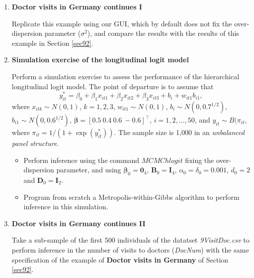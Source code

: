 \begin{enumerate}
\item \textbf{Doctor visits in Germany continues I}

Replicate this example using our GUI, which by default does not fix the over-dispersion parameter ($\sigma^2$), and compare the results with the results of this example in Section \ref{sec92}.

\item \textbf{Simulation exercise of the longitudinal logit model}

Perform a simulation exercise to assess the performance of the hierarchical longitudinal logit model. The point of departure is to assume that \[y_{it}^*=\beta_0+\beta_1x_{it1}+\beta_2x_{it2}+\beta_3x_{it3}+b_i+w_{it1}b_{i1},\]
where $x_{itk}\sim N(0,1)$, $k=1,2,3$, $w_{it1}\sim N(0,1)$, $b_i\sim N(0, 0.7^{1/2})$, $b_{i1}\sim N(0, 0.6^{1/2})$, $\bm{\beta}=[0.5 \ 0.4 \ 0.6 \ -0.6]^{\top}$, $i=1,2,\dots,50$, and $y_{it}\sim B(\pi_{it}$, where $\pi_{it}=1/(1+\exp(y_{it}^*))$. The sample size is 1,000 in an \textit{unbalanced panel structure}.

\begin{itemize}
	\item Perform inference using the command $MCMChlogit$ fixing the over-dispersion parameter, and using $\bm{\beta}_0=\bm{0}_4$, $\bm{B}_0=\bm{I}_4$, $\alpha_0=\delta_0=0.001$, $d_0=2$ and $\bm{D}_0=\bm{I}_2$.
	\item Program from scratch a Metropolis-within-Gibbs algorithm to perform inference in this simulation.  
\end{itemize} 

\item \textbf{Doctor visits in Germany continues II} 

Take a sub-sample of the first 500 individuals of the datatset \textit{9VisitDoc.csv} to perform inference in the number of visits to doctors (\textit{DocNum}) with the same specification of the example of \textbf{Doctor visits in Germany} of Section \ref{sec92}.	
\end{enumerate}